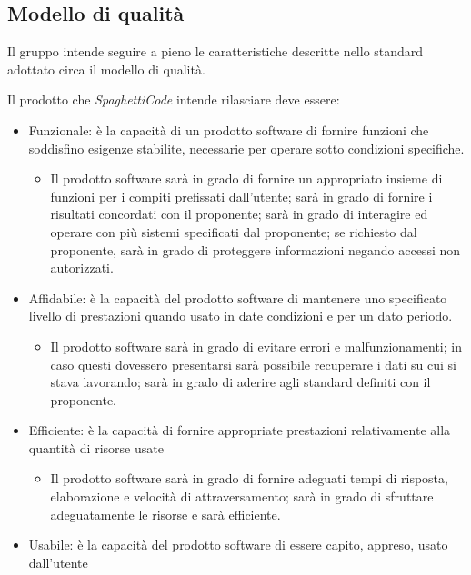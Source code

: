 \documentclass[../piano_di_qualifica.tex]{subfiles}
\begin{document}
\subsection{Modello di qualità}
Il gruppo intende seguire a pieno le caratteristiche descritte nello standard adottato circa il modello di qualità.\par
Il prodotto che \emph{SpaghettiCode} intende rilasciare deve essere:\par
\begin{itemize}
	\item Funzionale: è la capacità di un prodotto software di fornire funzioni che soddisfino esigenze stabilite, necessarie per operare sotto condizioni specifiche.
	      \begin{itemize}
		      \item Il prodotto software sarà in grado di fornire un appropriato insieme di funzioni per i compiti prefissati dall’utente; sarà in grado di fornire i risultati concordati con il proponente; sarà in grado di interagire ed operare con più sistemi specificati dal proponente; se richiesto dal proponente, sarà in grado di proteggere informazioni negando accessi non autorizzati.
	      \end{itemize}
	\item Affidabile: è la capacità del prodotto software di mantenere uno specificato livello di prestazioni quando usato in date condizioni e per un dato periodo.
	      \begin{itemize}
		      \item Il prodotto software sarà in grado di evitare errori e malfunzionamenti; in caso questi dovessero presentarsi sarà possibile recuperare i dati su cui si stava lavorando; sarà in grado di aderire agli standard definiti con il proponente.
	      \end{itemize}
	\item Efficiente: è la capacità di fornire appropriate prestazioni relativamente alla quantità di risorse usate
	      \begin{itemize}
		      \item Il prodotto software sarà in grado di fornire adeguati tempi di risposta, elaborazione e velocità di attraversamento; sarà in grado di sfruttare adeguatamente le risorse e sarà efficiente.
	      \end{itemize}
	\item Usabile: è la capacità del prodotto software di essere capito, appreso, usato dall'utente
	      \begin{itemize}

\end{itemize}
\end{itemize}
\end{document}

